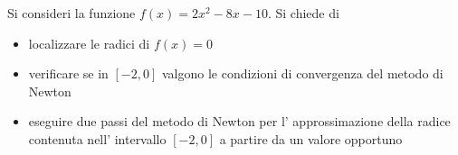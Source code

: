 Si consideri la funzione $f(x)=2x^2-8x-10$.
Si chiede di
\begin{itemize}
\item localizzare le radici di $f(x)=0$
\item verificare se in $[-2,0]$ valgono le condizioni di convergenza del metodo di Newton
\item eseguire due passi del metodo di Newton per l' approssimazione della radice  contenuta nell' intervallo $[-2,0]$ a partire da un valore opportuno
\end{itemize}
